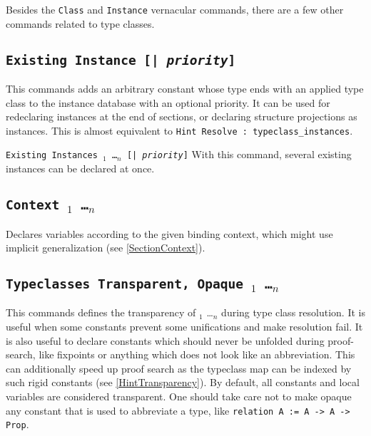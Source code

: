 Besides the {\tt Class} and {\tt Instance} vernacular commands, there
are a few other commands related to type classes.

\subsection{\tt Existing Instance {\ident} [| \textit{priority}]}
\label{ExistingInstance}

This commands adds an arbitrary constant whose type ends with an applied
type class to the instance database with an optional priority. It can be used
for redeclaring instances at the end of sections, or declaring structure
projections as instances. This is almost equivalent to {\tt Hint Resolve
{\ident} : typeclass\_instances}.

\begin{Variants}
\item {\tt Existing Instances {\ident}$_1$ \ldots {\ident}$_n$
  [| \textit{priority}]}
  With this command, several existing instances can be declared at once.
\end{Variants}

\subsection{\tt Context {\binder$_1$ \ldots \binder$_n$}}
\label{Context}

Declares variables according to the given binding context, which might
use implicit generalization (see \ref{SectionContext}).

\subsection{\tt Typeclasses Transparent, Opaque {\ident$_1$ \ldots \ident$_n$}}
\label{TypeclassesTransparency}

This commands defines the transparency of {\ident$_1$ \ldots \ident$_n$} 
during type class resolution. It is useful when some constants prevent some
unifications and make resolution fail. It is also useful to declare
constants which should never be unfolded during proof-search, like
fixpoints or anything which does not look like an abbreviation. This can
additionally speed up proof search as the typeclass map can be indexed
by such rigid constants (see \ref{HintTransparency}).
By default, all constants and local variables are considered transparent.
One should take care not to make opaque any constant that is used to
abbreviate a type, like {\tt relation A := A -> A -> Prop}.

